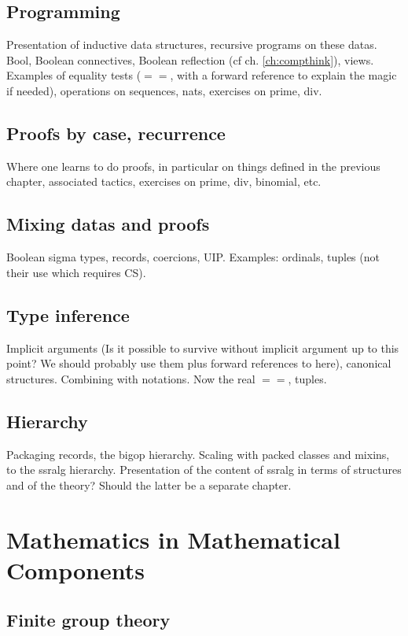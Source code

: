 \documentclass{book}
\begin{document}
\chapter{Programming}

Presentation of inductive data structures, recursive programs on these
datas.
Bool, Boolean connectives, Boolean reflection (cf
ch. \ref{ch:compthink}), views.
Examples of equality tests ($==$, with a forward reference to
explain the magic if needed), operations on sequences, nats,
exercises on prime, div.

\chapter{Proofs by case, recurrence}

Where one learns to do proofs, in particular on things defined in the
previous chapter, associated tactics, exercises on prime, div,
binomial, etc.

\chapter{Mixing datas and proofs}
Boolean sigma types, records, coercions, UIP. Examples: ordinals,
tuples (not their use which requires CS).

\chapter{Type inference}

Implicit arguments (Is it possible to survive without implicit
argument up to this point? We should probably use them plus forward
references to here), canonical structures. Combining with
notations. Now the real $==$, tuples.
\chapter{Hierarchy}
Packaging records, the bigop hierarchy.
Scaling with packed classes and mixins, to the ssralg
hierarchy. Presentation of the content of ssralg in terms of structures
and of the theory? Should the latter be a separate chapter.

\part{Mathematics in Mathematical Components}

\chapter{Finite group theory}
\end{document}
